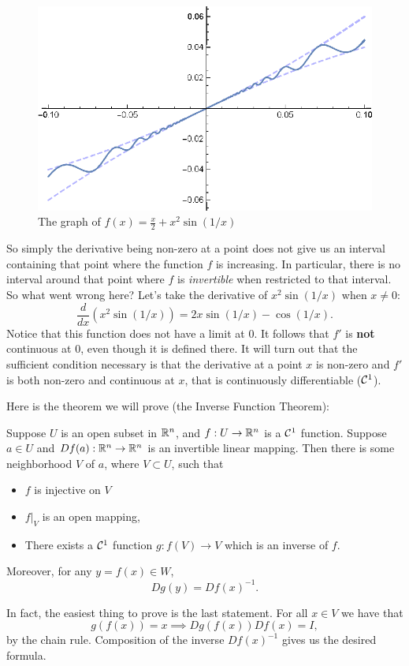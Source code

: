 \begin{figure}[h]
	\centering
	\includegraphics{plots_gr2.eps}
	\caption{The graph of $f(x) = \frac{x}{2} + x^2\sin(1/x)$}
	\label{fig:plots_gr2}
\end{figure}

So simply the derivative being non-zero at a point does not give us an interval containing that point where the function $f$ is increasing. In particular, there is no interval around that point where $f$ is \textit{invertible} when restricted to that interval. So what went wrong here? Let's take the derivative of $x^2\sin(1/x)$ when $x \neq 0$:
\[\frac{d}{dx}(x^2\sin(1/x)) = 2x\sin(1/x) - \cos(1/x).\]
Notice that this function does not have a limit at $0$. It follows that $f'$ is \textbf{not} continuous at $0$, even though it is defined there. It will turn out that the sufficient condition necessary is that the derivative at a point $x$ is non-zero and $f'$ is both non-zero and continuous at $x$, that is continuously differentiable ($\mathcal{C}^{1}$).

Here is the theorem we will prove (the Inverse Function Theorem):

\begin{theorem}
Suppose $U$ is an open subset in $\mathbb{R}^n$, and $f: U \to \mathbb{R}^n$ is a $\mathcal{C}^{1}$ function. Suppose $a \in U$ and $Df(a): \mathbb{R}^n \to \mathbb{R}^n$ is an invertible linear mapping. Then there is some neighborhood $V$ of $a$, where $V \subset U$, such that 
\begin{itemize}
	\item $f$ is injective on $V$
	\item $f|_V$ is an open mapping,
	\item There exists a $\mathcal{C}^{1}$ function $g: f(V) \to V$ which is an inverse of $f$.
\end{itemize}
Moreover, for any $y = f(x) \in W$,
\[Dg(y) = Df(x)^{-1}.\]
\end{theorem}

In fact, the easiest thing to prove is the last statement. For all $x \in V$ we have that 
\[g(f(x)) = x \implies Dg(f(x))Df(x) = I,\] by the chain rule. Composition of the inverse $Df(x)^{-1}$ gives us the desired formula.